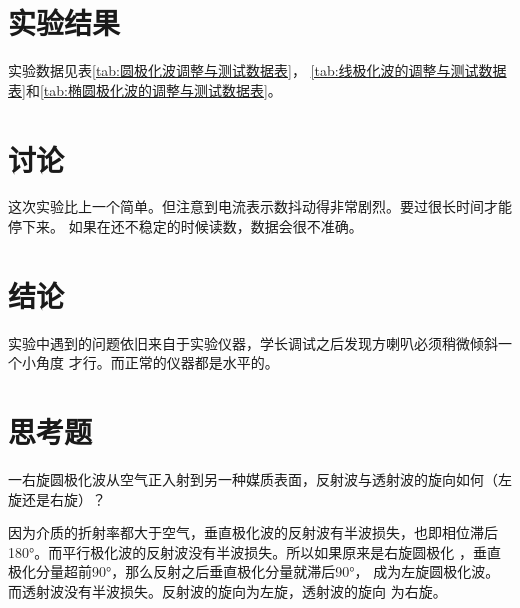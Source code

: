 \documentclass[../main]{subfiles}
\begin{document}
\section{实验结果}%
\label{sec:\arabic{chapter}实验结果}

实验数据见表\ref{tab:圆极化波调整与测试数据表}，
\ref{tab:线极化波的调整与测试数据表}和\ref{tab:椭圆极化波的调整与测试数据表}。

\section{讨论}%
\label{sec:\arabic{chapter}讨论}

这次实验比上一个简单。但注意到电流表示数抖动得非常剧烈。要过很长时间才能停下来。
如果在还不稳定的时候读数，数据会很不准确。

\section{结论}%
\label{sec:\arabic{chapter}结论}

实验中遇到的问题依旧来自于实验仪器，学长调试之后发现方喇叭必须稍微倾斜一个小角度
才行。而正常的仪器都是水平的。

\section{思考题}%
\label{sec:\arabic{chapter}思考题}

\begin{Exercise}

	一右旋圆极化波从空气正入射到另一种媒质表面，反射波与透射波的旋向如何（左
	旋还是右旋）？

\end{Exercise}

\begin{Answer}

	因为介质的折射率都大于空气，垂直极化波的反射波有半波损失，也即相位滞后
	\ang{180;;}。而平行极化波的反射波没有半波损失。所以如果原来是右旋圆极化
	，垂直极化分量超前\ang{90;;}，那么反射之后垂直极化分量就滞后\ang{90;;}，
	成为左旋圆极化波。而透射波没有半波损失。反射波的旋向为左旋，透射波的旋向
	为右旋。

\end{Answer}
\end{document}
